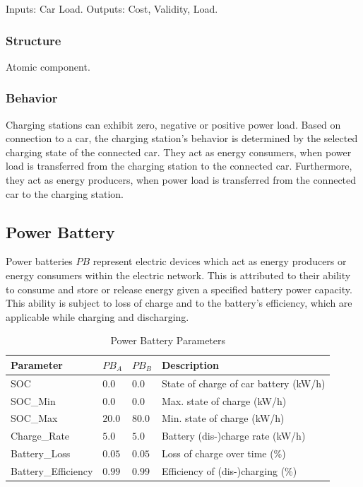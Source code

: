 Inputs: Car Load. Outputs: Cost, Validity, Load.

\subsubsection{Structure}

Atomic component.

\subsubsection{Behavior}

Charging stations can exhibit zero, negative or positive power load. Based on connection to a car, the charging station's behavior is determined by the selected charging state of the connected car. They act as energy consumers, when power load is transferred from the charging station to the connected car. Furthermore, they act as energy producers, when power load is transferred from the connected car to the charging station.

\subsection{Power Battery}
Power batteries $PB$ represent electric devices which act as energy producers or energy consumers within the electric network.
This is attributed to their ability to consume and store or release energy given a specified battery power capacity. This ability is subject to loss of charge and to the battery's efficiency, which are applicable while charging and discharging. 

\begin{table}[h]
	\renewcommand{\arraystretch}{1.3}
	\caption{Power Battery Parameters}
	\centering
	\begin{tabular}{llll}
		\hline
		\textbf{Parameter}     & \textbf{$PB_{A}$} & \textbf{$PB_{B}$} & \textbf{Description} \\ \hline
		SOC                     & $0.0$ & $0.0$ & State of charge of car battery (kW/h)                   \\
		SOC\_Min                & $0.0$ & $0.0$ & Max. state of charge (kW/h)                   \\
		SOC\_Max               & $20.0$ & $80.0$ &  Min. state of charge (kW/h)                    \\
		Charge\_Rate            & $5.0$ & $5.0$ & Battery (dis-)charge rate (kW/h)     \\ 
		Battery\_Loss           & $0.05$ & $0.05$ & Loss of charge over time (\%)\\
		Battery\_Efficiency      & $0.99$ & $0.99$ &Efficiency of (dis-)charging (\%)     \\ \hline
	\end{tabular}
\end{table}

